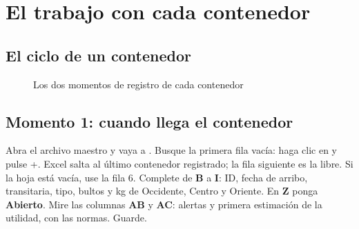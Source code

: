 \chapter{El trabajo con cada contenedor}\label{cap:diario}

\section{El ciclo de un contenedor}

\begin{figure}[H]\centering
{}
\caption{Los dos momentos de registro de cada contenedor}
\end{figure}

\section{Momento 1: cuando llega el contenedor}

\begin{pasos}
\paso Abra el archivo maestro y vaya a .
\paso Busque la primera fila vacía: haga clic en  y pulse +\tecla{$\downarrow$}. Excel salta al último contenedor
      registrado; la fila siguiente es la libre. Si la hoja está vacía, use la fila 6.
\paso Complete de \textbf{B} a \textbf{I}: ID, fecha de arribo, transitaria, tipo, bultos y kg de Occidente, Centro y Oriente.
\paso En \textbf{Z} ponga \textbf{Abierto}.
\paso Mire las columnas \textbf{AB} y \textbf{AC}: alertas y primera estimación de la utilidad, con las normas.
\paso Guarde.
\end{pasos}

